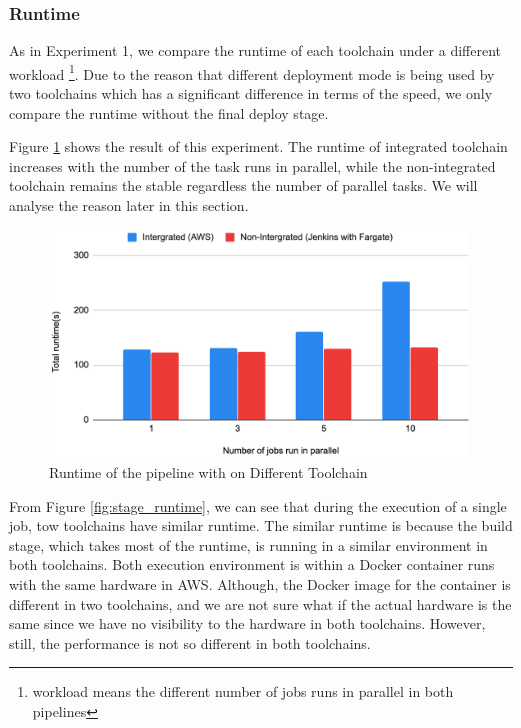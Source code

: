 \subsubsection{Runtime}
As in Experiment 1, we compare the runtime of each toolchain under a different workload \footnote{ workload means the different number of jobs runs in parallel in both pipelines}. Due to the reason that different deployment mode is being used by two toolchains which has a significant difference in terms of the speed, we only compare the runtime without the final deploy stage. 
\par
Figure \ref{fig:compareaws} shows the result of this experiment. The runtime of integrated toolchain  increases with the number of the task runs in parallel, while the non-integrated toolchain remains the stable regardless the number of parallel tasks. We will analyse the reason later in this section.
\begin{figure}[!h]
    \centering
    \includegraphics[width=0.99\textwidth]{pics/compare-aws.png}
    \caption{Runtime of the pipeline with on Different Toolchain}
    \label{fig:compareaws}
    \end{figure}
  \par
From Figure \ref{fig:stage_runtime}, we can see that during the execution of a single job, tow toolchains have similar runtime. The similar runtime is because the build stage, which takes most of the runtime, is running in a similar environment in both toolchains. Both execution environment is within a Docker container runs with the same hardware in AWS. Although, the Docker image for the container is different in two toolchains, and we are not sure what if the actual hardware is the same since we have no visibility to the hardware in both toolchains. However, still, the performance is not so different in both toolchains.
\par
